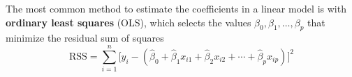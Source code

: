 \documentclass{article}
\newcommand{\argmin}[2]{\underset{#1}{\text{arg min}}\left\{#2\right\}}
\begin{document}
	The most common method to estimate the coefficients in a linear model is with \textbf{ordinary least squares} (OLS), which selects the values $\beta_0, \beta_1, \dotsc, \beta_p$ that minimize the residual sum of squares
	\begin{equation}\label{eqn:RSS}
		\text{RSS} = \sum\limits_{i = 1}^n \Big[y_i - (\hat{\beta}_0 + \hat{\beta}_1 x_{i1} + \hat{\beta}_2 x_{i2} + \cdots + \hat{\beta}_p x_{ip})\Big]^2
	\end{equation}
	

	
\end{document}
